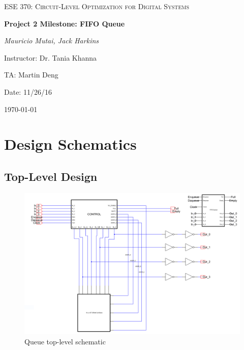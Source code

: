 \documentclass[12pt]{report}
\begin{document}
\begin{titlepage}
	\centering
	\vspace{1cm}
	{\scshape\Large ESE 370: Circuit-Level Optimization for Digital Systems\par}
	\vspace{1.5cm}
	{\huge\bfseries Project 2 Milestone: FIFO Queue\par}
	\vspace{2cm}
	{\Large\itshape Mauricio Mutai, Jack Harkins\par}
	\vfill
	Instructor: Dr. Tania Khanna\par
	TA: Martin Deng\par
	Date: 11/26/16

	\vfill

	{\large \today\par}
\end{titlepage}

\section*{Design Schematics}
\subsection*{Top-Level Design}
\begin{figure}[H]
  \centering
    \includegraphics[width=1.0\textwidth]{Schematics/queue_toplevel_schematic.PNG}
  \caption{Queue top-level schematic}
  \label{fig:queue_toplevel_schematic}
\end{figure}
\end{document}
